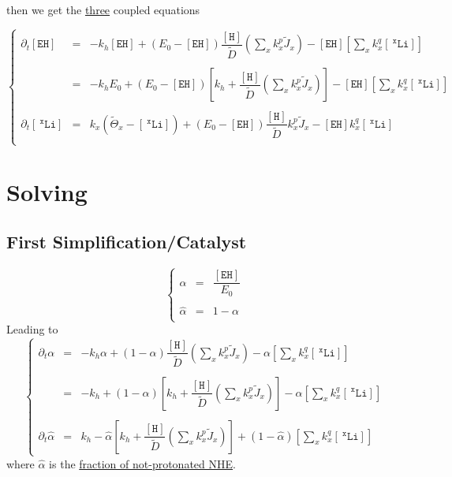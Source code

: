 \documentclass[aps,onecolumn,10pt]{revtex4}
\newcommand{\mychem}[1]{\mathtt{#1}}
\newcommand{\myconc}[1]{\left\lbrack{#1}\right\rbrack}
\newcommand{\spLi}[1]{{~^{\mychem{#1}}\mychem{Li}}}
\newcommand{\Li}[1]{\myconc{\spLi{#1}}}
\newcommand{\spEHin}{\mychem{EH}}
\newcommand{\EHin}{\myconc{\spEHin}}
\newcommand{\spproton}{\mychem{H}}
\newcommand{\proton}{\myconc{\spproton}}
\begin{document}
then we get the \underline{three} coupled equations  

\begin{equation}
\left\lbrace
	\begin{array}{rcl}
		\partial_t\EHin & = & -k_h \EHin + \left(E_0- \EHin\right) \dfrac{\proton}{\tilde{D}} \left(\sum_x k_x^p \tilde{J}_x \right)  
		- \EHin \left\lbrack {\sum_x k_x^q \Li{x}} \right\rbrack
		\\
		\\
		& = & 
		-k_h E_0+ \left(E_0- \EHin\right)\left\lbrack k_h+ \dfrac{\proton}{\tilde{D}} \left(\sum_x k_x^p \tilde{J}_x \right)\right] 
		- \EHin \left\lbrack {\sum_x k_x^q \Li{x}} \right\rbrack
		\\
		\\
		\partial_t\Li{x} & = & k_x \left(\tilde{\Theta}_x -\Li{x} \right)  + \left(E_0-\EHin\right) \dfrac{\proton}{\tilde{D}}   k_x^p \tilde{J}_x  
		- \EHin k_x^q \Li{x}
		\\
	\end{array}
\right.
\end{equation}

\section{Solving}

\subsection{First Simplification/Catalyst}
\begin{equation}
\left\lbrace
\begin{array}{rcl}
	\alpha & = & \dfrac{\EHin}{E_0}\\
	\\
	\hat\alpha & = & 1-\alpha\\
\end{array}
\right.
\end{equation}
Leading to
\begin{equation}
\label{eq:alpha}
\left\lbrace
\begin{array}{rcl}
\partial_t\alpha & = & -k_h \alpha + \left(1- \alpha\right) \dfrac{\proton}{\tilde{D}} \left(\sum_x k_x^p \tilde{J}_x \right)  
		- \alpha \left\lbrack {\sum_x k_x^q \Li{x}} \right\rbrack
		\\
		\\
		& = & 
		-k_h + \left(1- \alpha\right)\left\lbrack k_h+ \dfrac{\proton}{\tilde{D}} \left(\sum_x k_x^p \tilde{J}_x \right)\right] 
		- \alpha \left\lbrack {\sum_x k_x^q \Li{x}} \right\rbrack
		\\
		\\
	\partial_t \hat\alpha & = & k_h - \hat\alpha \left\lbrack k_h+ \dfrac{\proton}{\tilde{D}} \left(\sum_x k_x^p \tilde{J}_x \right)\right] 
		+ (1-\hat\alpha) \left\lbrack {\sum_x k_x^q \Li{x}} \right\rbrack
		\end{array}
\right.
\end{equation}
where $\hat\alpha$ is the \underline{fraction of not-protonated NHE}.
\end{document}
